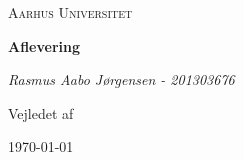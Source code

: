 \documentclass[a4paper,oneside,article]{memoir}
\begin{document}
\begin{titlingpage}
	\centering
	{\scshape\LARGE Aarhus Universitet \par} %
	\vspace{1cm}

	{\huge\bfseries Aflevering\par} %
	\vspace{2cm}
	{\Large\itshape Rasmus Aabo Jørgensen - 201303676 \par} %
	\vfill
	Vejledet af\par
	
	\vfill
	
	{\large \today\par} %
\end{titlingpage}

\tableofcontents
\end{document}
